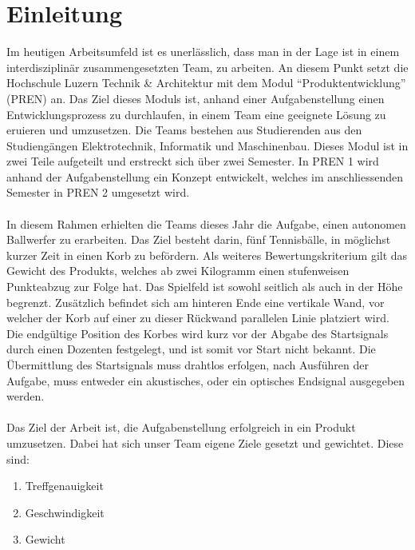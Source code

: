 \section{Einleitung}
Im heutigen Arbeitsumfeld ist es unerlässlich, dass man in der Lage ist in 
einem interdisziplinär zusammengesetzten Team, zu arbeiten. An diesem Punkt 
setzt die Hochschule Luzern Technik \& Architektur mit dem Modul 
\enquote{Produktentwicklung} (PREN) an. Das Ziel dieses Moduls ist, anhand 
einer Aufgabenstellung einen Entwicklungsprozess zu durchlaufen, in einem 
Team eine geeignete Lösung zu eruieren und umzusetzen. Die Teams bestehen 
aus Studierenden aus den Studiengängen Elektrotechnik, Informatik und 
Maschinenbau. Dieses Modul ist in zwei Teile aufgeteilt und erstreckt sich 
über zwei Semester. In PREN 1 wird anhand der Aufgabenstellung ein Konzept 
entwickelt, welches im anschliessenden Semester in PREN 2 umgesetzt wird.\\
\\
In diesem Rahmen erhielten die Teams dieses Jahr die Aufgabe, einen autonomen 
Ballwerfer zu erarbeiten. Das Ziel besteht darin, fünf Tennisbälle, in möglichst 
kurzer Zeit in einen Korb zu befördern. Als weiteres Bewertungskriterium gilt 
das Gewicht des Produkts, welches ab zwei Kilogramm einen stufenweisen 
Punkteabzug zur Folge hat. Das Spielfeld ist sowohl seitlich als auch in der 
Höhe begrenzt. Zusätzlich befindet sich am hinteren Ende eine vertikale Wand, 
vor welcher der Korb auf einer zu dieser Rückwand parallelen Linie platziert 
wird. Die endgültige Position des Korbes wird kurz vor der Abgabe des Startsignals 
durch einen Dozenten festgelegt, und ist somit vor Start nicht bekannt. Die 
Übermittlung des Startsignals muss drahtlos erfolgen, nach Ausführen der Aufgabe, 
muss entweder ein akustisches, oder ein optisches Endsignal ausgegeben werden.\\
\\
Das Ziel der Arbeit ist, die Aufgabenstellung erfolgreich in ein Produkt 
umzusetzen. Dabei hat sich unser Team eigene Ziele gesetzt und gewichtet. 
Diese sind:
\begin{enumerate}
    \item Treffgenauigkeit
    \item Geschwindigkeit
    \item Gewicht
\end{enumerate}
